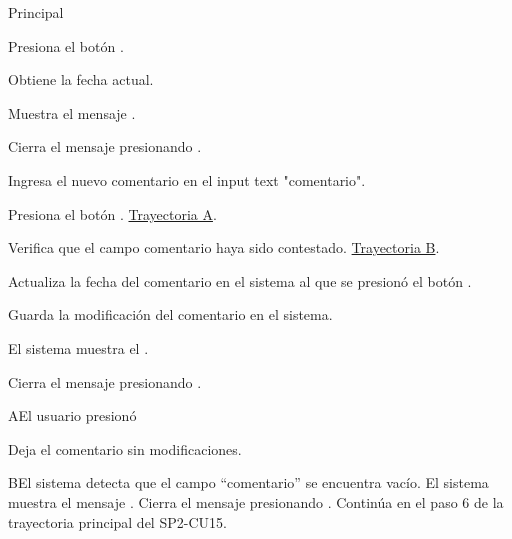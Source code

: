 \begin{UCtrayectoria}{Principal}


    \UCpaso[\UCactor] Presiona el botón . 
    
    \UCpaso Obtiene la fecha actual. 
    
    \UCpaso Muestra el mensaje .

    \UCpaso[\UCactor] Cierra el mensaje presionando .
    
    \UCpaso[\UCactor] Ingresa el nuevo comentario en el input text "comentario".
    
    \UCpaso[\UCactor] Presiona el botón . \hyperref[SP2-CU15-A]{Trayectoria A}.
    
    \UCpaso Verifica que el campo comentario haya sido contestado. \hyperref[SP2-CU15-B]{Trayectoria B}.

    \UCpaso Actualiza la fecha del comentario en el sistema al que se presionó el botón .

    \UCpaso Guarda la modificación del comentario en el sistema.

    \UCpaso El sistema muestra el  .

    \UCpaso[\UCactor] Cierra el mensaje presionando .


\end{UCtrayectoria}


\label{SP2-CU15-A}
\begin{UCtrayectoriaA}{A}{El usuario presionó }

  \UCpaso Deja el comentario sin modificaciones.
\end{UCtrayectoriaA}

\label{SP2-CU15-B}
\begin{UCtrayectoriaA}{B}{El sistema detecta que el campo “comentario” se encuentra vacío.} 
    \UCpaso El sistema muestra el mensaje .
    \UCpaso[\UCactor] Cierra el mensaje presionando .
    \UCpaso Continúa en el paso 6 de la trayectoria principal del SP2-CU15.
\end{UCtrayectoriaA}

